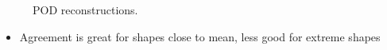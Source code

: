 \documentclass[9pt]{beamer}
\begin{document}
\begin{frame}
\begin{figure}
      \vspace*{-0.5cm}
      \vspace*{0cm}\caption{POD reconstructions.}
\end{figure}

\begin{itemize}
\item Agreement is great for shapes close to mean, less good for extreme shapes
\end{itemize}
\end{frame}
\end{document}
